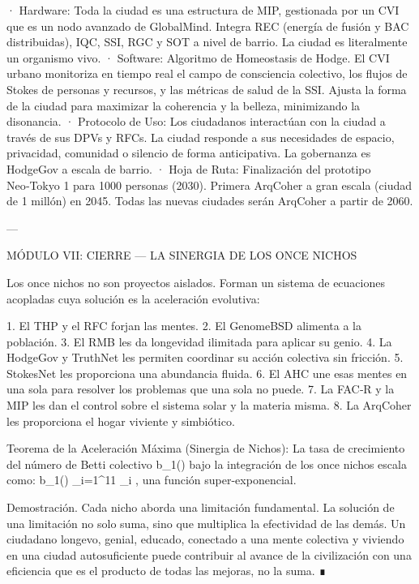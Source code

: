 \documentclass[12pt,twoside]{book}
\begin{document}
· Hardware: Toda la ciudad es una estructura de MIP, gestionada por un CVI que es un nodo avanzado de GlobalMind. Integra REC (energía de fusión y BAC distribuidas), IQC, SSI, RGC y SOT a nivel de barrio. La ciudad es literalmente un organismo vivo.
· Software: Algoritmo de Homeostasis de Hodge. El CVI urbano monitoriza en tiempo real el campo de consciencia colectivo, los flujos de Stokes de personas y recursos, y las métricas de salud de la SSI. Ajusta la forma de la ciudad para maximizar la coherencia y la belleza, minimizando la disonancia.
· Protocolo de Uso: Los ciudadanos interactúan con la ciudad a través de sus DPVs y RFCs. La ciudad responde a sus necesidades de espacio, privacidad, comunidad o silencio de forma anticipativa. La gobernanza es HodgeGov a escala de barrio.
· Hoja de Ruta: Finalización del prototipo Neo‑Tokyo 1 para 1000 personas (2030). Primera ArqCoher a gran escala (ciudad de 1 millón) en 2045. Todas las nuevas ciudades serán ArqCoher a partir de 2060.

---

MÓDULO VII: CIERRE — LA SINERGIA DE LOS ONCE NICHOS

Los once nichos no son proyectos aislados. Forman un sistema de ecuaciones acopladas cuya solución es la aceleración evolutiva:

1. El THP y el RFC forjan las mentes.
2. El GenomeBSD alimenta a la población.
3. El RMB les da longevidad ilimitada para aplicar su genio.
4. La HodgeGov y TruthNet les permiten coordinar su acción colectiva sin fricción.
5. StokesNet les proporciona una abundancia fluida.
6. El AHC une esas mentes en una sola para resolver los problemas que una sola no puede.
7. La FAC‑R y la MIP les dan el control sobre el sistema solar y la materia misma.
8. La ArqCoher les proporciona el hogar viviente y simbiótico.

Teorema de la Aceleración Máxima (Sinergia de Nichos):
La tasa de crecimiento del número de Betti colectivo  b_1(\Xi)  bajo la integración de los once nichos escala como:
  b_1(\Xi) \propto \prod_{i=1}^{11} _i ,
una función super-exponencial.

Demostración. Cada nicho aborda una limitación fundamental. La solución de una limitación no solo suma, sino que multiplica la efectividad de las demás. Un ciudadano longevo, genial, educado, conectado a una mente colectiva y viviendo en una ciudad autosuficiente puede contribuir al avance de la civilización con una eficiencia que es el producto de todas las mejoras, no la suma. ∎
\end{document}
